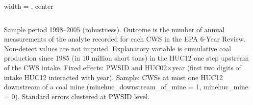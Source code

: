\begin{table}[htbp]
\begin{adjustbox}{width = \textwidth, center}
\begin{tabular}{lccc}
         \bottomrule
         
      \end{tabular}
      
      
      
   \end{adjustbox}
      {\tiny\linespread{1}\selectfont \par \raggedright 
   Sample period 1998--2005 (robustness). Outcome is the number of annual measurements of the analyte recorded for each CWS in the EPA 6-Year Review. Non-detect values are not imputed. Explanatory variable is cumulative coal production since 1985 (in 10 million short tons) in the HUC12 one step upstream of the CWS intake. Fixed effects: PWSID and HUC02$\times$year (first two digits of intake HUC12 interacted with year). Sample: CWSs at most one HUC12 downstream of a coal mine (minehuc\_downstream\_of\_mine = 1, minehuc\_mine = 0). Standard errors clustered at PWSID level.}
   
\end{table}


